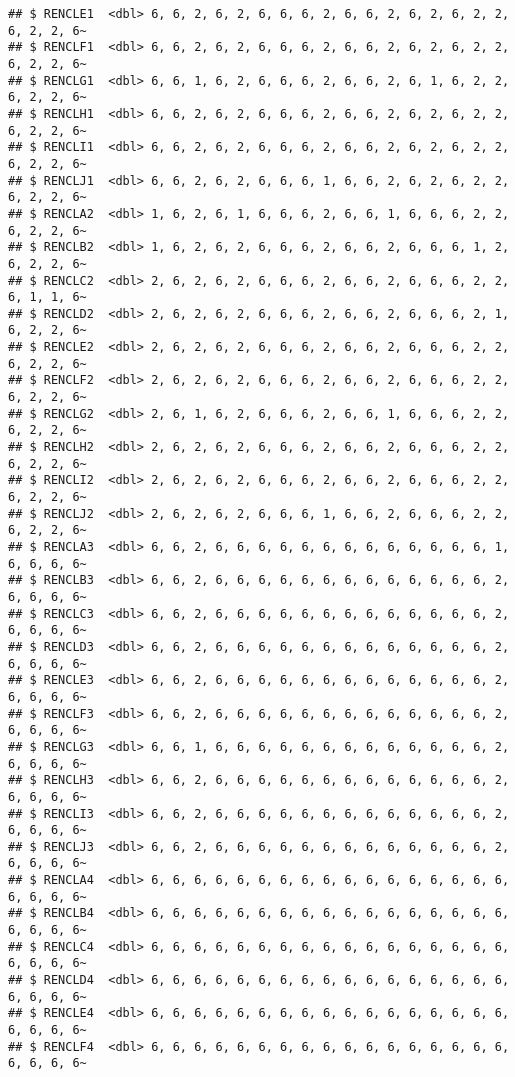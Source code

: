 \documentclass[
]{article}
\begin{document}
\begin{verbatim}
## $ RENCLE1  <dbl> 6, 6, 2, 6, 2, 6, 6, 6, 2, 6, 6, 2, 6, 2, 6, 2, 2, 6, 2, 2, 6~
## $ RENCLF1  <dbl> 6, 6, 2, 6, 2, 6, 6, 6, 2, 6, 6, 2, 6, 2, 6, 2, 2, 6, 2, 2, 6~
## $ RENCLG1  <dbl> 6, 6, 1, 6, 2, 6, 6, 6, 2, 6, 6, 2, 6, 1, 6, 2, 2, 6, 2, 2, 6~
## $ RENCLH1  <dbl> 6, 6, 2, 6, 2, 6, 6, 6, 2, 6, 6, 2, 6, 2, 6, 2, 2, 6, 2, 2, 6~
## $ RENCLI1  <dbl> 6, 6, 2, 6, 2, 6, 6, 6, 2, 6, 6, 2, 6, 2, 6, 2, 2, 6, 2, 2, 6~
## $ RENCLJ1  <dbl> 6, 6, 2, 6, 2, 6, 6, 6, 1, 6, 6, 2, 6, 2, 6, 2, 2, 6, 2, 2, 6~
## $ RENCLA2  <dbl> 1, 6, 2, 6, 1, 6, 6, 6, 2, 6, 6, 1, 6, 6, 6, 2, 2, 6, 2, 2, 6~
## $ RENCLB2  <dbl> 1, 6, 2, 6, 2, 6, 6, 6, 2, 6, 6, 2, 6, 6, 6, 1, 2, 6, 2, 2, 6~
## $ RENCLC2  <dbl> 2, 6, 2, 6, 2, 6, 6, 6, 2, 6, 6, 2, 6, 6, 6, 2, 2, 6, 1, 1, 6~
## $ RENCLD2  <dbl> 2, 6, 2, 6, 2, 6, 6, 6, 2, 6, 6, 2, 6, 6, 6, 2, 1, 6, 2, 2, 6~
## $ RENCLE2  <dbl> 2, 6, 2, 6, 2, 6, 6, 6, 2, 6, 6, 2, 6, 6, 6, 2, 2, 6, 2, 2, 6~
## $ RENCLF2  <dbl> 2, 6, 2, 6, 2, 6, 6, 6, 2, 6, 6, 2, 6, 6, 6, 2, 2, 6, 2, 2, 6~
## $ RENCLG2  <dbl> 2, 6, 1, 6, 2, 6, 6, 6, 2, 6, 6, 1, 6, 6, 6, 2, 2, 6, 2, 2, 6~
## $ RENCLH2  <dbl> 2, 6, 2, 6, 2, 6, 6, 6, 2, 6, 6, 2, 6, 6, 6, 2, 2, 6, 2, 2, 6~
## $ RENCLI2  <dbl> 2, 6, 2, 6, 2, 6, 6, 6, 2, 6, 6, 2, 6, 6, 6, 2, 2, 6, 2, 2, 6~
## $ RENCLJ2  <dbl> 2, 6, 2, 6, 2, 6, 6, 6, 1, 6, 6, 2, 6, 6, 6, 2, 2, 6, 2, 2, 6~
## $ RENCLA3  <dbl> 6, 6, 2, 6, 6, 6, 6, 6, 6, 6, 6, 6, 6, 6, 6, 6, 1, 6, 6, 6, 6~
## $ RENCLB3  <dbl> 6, 6, 2, 6, 6, 6, 6, 6, 6, 6, 6, 6, 6, 6, 6, 6, 2, 6, 6, 6, 6~
## $ RENCLC3  <dbl> 6, 6, 2, 6, 6, 6, 6, 6, 6, 6, 6, 6, 6, 6, 6, 6, 2, 6, 6, 6, 6~
## $ RENCLD3  <dbl> 6, 6, 2, 6, 6, 6, 6, 6, 6, 6, 6, 6, 6, 6, 6, 6, 2, 6, 6, 6, 6~
## $ RENCLE3  <dbl> 6, 6, 2, 6, 6, 6, 6, 6, 6, 6, 6, 6, 6, 6, 6, 6, 2, 6, 6, 6, 6~
## $ RENCLF3  <dbl> 6, 6, 2, 6, 6, 6, 6, 6, 6, 6, 6, 6, 6, 6, 6, 6, 2, 6, 6, 6, 6~
## $ RENCLG3  <dbl> 6, 6, 1, 6, 6, 6, 6, 6, 6, 6, 6, 6, 6, 6, 6, 6, 2, 6, 6, 6, 6~
## $ RENCLH3  <dbl> 6, 6, 2, 6, 6, 6, 6, 6, 6, 6, 6, 6, 6, 6, 6, 6, 2, 6, 6, 6, 6~
## $ RENCLI3  <dbl> 6, 6, 2, 6, 6, 6, 6, 6, 6, 6, 6, 6, 6, 6, 6, 6, 2, 6, 6, 6, 6~
## $ RENCLJ3  <dbl> 6, 6, 2, 6, 6, 6, 6, 6, 6, 6, 6, 6, 6, 6, 6, 6, 2, 6, 6, 6, 6~
## $ RENCLA4  <dbl> 6, 6, 6, 6, 6, 6, 6, 6, 6, 6, 6, 6, 6, 6, 6, 6, 6, 6, 6, 6, 6~
## $ RENCLB4  <dbl> 6, 6, 6, 6, 6, 6, 6, 6, 6, 6, 6, 6, 6, 6, 6, 6, 6, 6, 6, 6, 6~
## $ RENCLC4  <dbl> 6, 6, 6, 6, 6, 6, 6, 6, 6, 6, 6, 6, 6, 6, 6, 6, 6, 6, 6, 6, 6~
## $ RENCLD4  <dbl> 6, 6, 6, 6, 6, 6, 6, 6, 6, 6, 6, 6, 6, 6, 6, 6, 6, 6, 6, 6, 6~
## $ RENCLE4  <dbl> 6, 6, 6, 6, 6, 6, 6, 6, 6, 6, 6, 6, 6, 6, 6, 6, 6, 6, 6, 6, 6~
## $ RENCLF4  <dbl> 6, 6, 6, 6, 6, 6, 6, 6, 6, 6, 6, 6, 6, 6, 6, 6, 6, 6, 6, 6, 6~

\end{verbatim}
\end{document}
